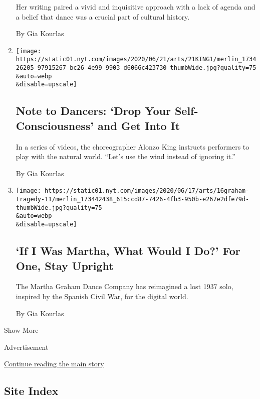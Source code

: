 \begin{enumerate}
  Her writing paired a vivid and inquisitive approach with a lack of
  agenda and a belief that dance was a crucial part of cultural history.

  By Gia Kourlas
\item
  \href{/2020/06/17/arts/dance/alonzo-king-lines.html}{}

  \texttt{[image: https://static01.nyt.com/images/2020/06/21/arts/21KING1/merlin\_173426205\_97915267-bc26-4e99-9903-d6066c423730-thumbWide.jpg?quality=75\\\&auto=webp\\\&disable=upscale]}

  \hypertarget{note-to-dancers-drop-your-self-consciousness-and-get-into-it}{%
  \subsection{Note to Dancers: `Drop Your Self-Consciousness' and Get
  Into
  It}\label{note-to-dancers-drop-your-self-consciousness-and-get-into-it}}

  In a series of videos, the choreographer Alonzo King instructs
  performers to play with the natural world. ``Let's use the wind
  instead of ignoring it.''

  By Gia Kourlas
\item
  \href{/2020/06/16/arts/dance/martha-graham-immediate-tragedy-virus.html}{}

  \texttt{[image: https://static01.nyt.com/images/2020/06/17/arts/16graham-tragedy-11/merlin\_173442438\_615ccd87-7426-4fb3-950b-e267e2dfe79d-thumbWide.jpg?quality=75\\\&auto=webp\\\&disable=upscale]}

  \hypertarget{if-i-was-martha-what-would-i-do-for-one-stay-upright}{%
  \subsection{`If I Was Martha, What Would I Do?' For One, Stay
  Upright}\label{if-i-was-martha-what-would-i-do-for-one-stay-upright}}

  The Martha Graham Dance Company has reimagined a lost 1937 solo,
  inspired by the Spanish Civil War, for the digital world.

  By Gia Kourlas
\end{enumerate}

Show More

Advertisement

\protect\hyperlink{after-mid2}{Continue reading the main story}

\hypertarget{site-index}{%
\subsection{Site Index}\label{site-index}}

